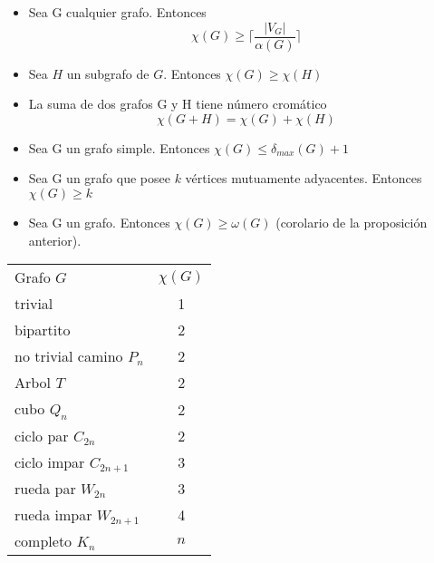 \documentclass[a4paper,11pt]{report}
\begin{document}
\begin{itemize}
\item Sea G cualquier grafo. Entonces $$\chi(G) \geqslant \lceil \frac{|V_G|}{\alpha(G)} \rceil$$
\item Sea $H$ un subgrafo de $G$. Entonces $\chi(G) \geqslant \chi(H)$
\item La suma de dos grafos G y H tiene número cromático $$\chi(G+H)=\chi(G)+\chi(H)$$
\item Sea G un grafo simple. Entonces $\chi(G) \leqslant \delta_{max}(G)+1$
\item Sea G un grafo que posee $k$ vértices mutuamente adyacentes. Entonces $\chi(G) \geqslant k$
\item Sea G un grafo. Entonces $\chi(G) \geqslant \omega(G)$ (corolario de la proposición anterior). \\
\end{itemize}
\begin{tabular}{l c}
Grafo $G$ & $\chi(G)$ \\
trivial & 1 \\
bipartito & 2 \\
no trivial camino $P_n$ & 2 \\
Arbol $T$ & 2 \\
cubo $Q_n$ & 2 \\
ciclo par $C_{2n}$ & 2\\
ciclo impar $C_{2n+1}$ & 3 \\
rueda par $W_{2n}$ & 3 \\
rueda impar $W_{2n+1}$ & 4 \\
completo $K_n$ & $n$ \\
\end{tabular} \\
\end{document}
